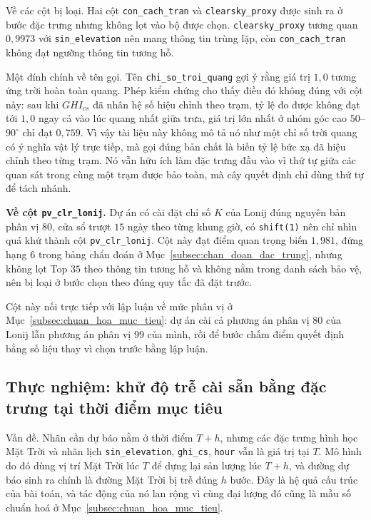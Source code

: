 \documentclass[12pt, a4paper]{report}
\begin{document}
Về các cột bị loại. Hai cột \texttt{con\_cach\_tran} và \texttt{clearsky\_proxy} được sinh ra ở bước đặc trưng nhưng
không lọt vào bộ được chọn. \texttt{clearsky\_proxy} tương quan $0{,}9973$ với
\texttt{sin\_elevation} nên mang thông tin trùng lặp, còn \texttt{con\_cach\_tran} không đạt ngưỡng
thông tin tương hỗ.

Một đính chính về tên gọi. Tên \texttt{chi\_so\_troi\_quang} gợi ý rằng giá trị $1{,}0$
tương ứng trời hoàn toàn quang. Phép kiểm chứng cho thấy điều đó không đúng với cột này: sau
khi $GHI_{cs}$ đã nhân hệ số hiệu chỉnh theo trạm, tỷ lệ đo được không đạt tới $1{,}0$
ngay cả vào lúc quang nhất giữa trưa, giá trị lớn nhất ở nhóm góc cao $50$--$90^\circ$ chỉ
đạt $0{,}759$. Vì vậy tài liệu này không mô tả nó như một chỉ số trời quang có ý nghĩa vật lý
trực tiếp, mà gọi đúng bản chất là biến tỷ lệ bức xạ đã hiệu chỉnh theo từng trạm. Nó
vẫn hữu ích làm đặc trưng đầu vào vì thứ tự giữa các quan sát trong cùng một trạm được bảo
toàn, mà cây quyết định chỉ dùng thứ tự để tách nhánh.

\textbf{Về cột \texttt{pv\_clr\_lonij}.} Dự án có cài đặt chỉ số $K$ của Lonij đúng nguyên bản
phân vị $80$, cửa sổ trượt $15$ ngày theo từng khung giờ, có \texttt{shift(1)} nên chỉ nhìn quá
khứ thành cột \texttt{pv\_clr\_lonij}. Cột này đạt điểm quan trọng biến $1{,}981$, đứng hạng $6$
trong bảng chẩn đoán ở Mục~\ref{subsec:chan_doan_dac_trung}, nhưng không lọt Top $35$ theo thông tin tương hỗ và không nằm
trong danh sách bảo vệ, nên bị loại ở bước chọn theo đúng quy tắc đã đặt trước.

Cột này nối trực tiếp với lập luận về mức phân vị ở Mục~\ref{subsec:chuan_hoa_muc_tieu}: dự án cài cả phương án phân vị
$80$ của Lonij lẫn phương án phân vị $99$ của mình, rồi để bước chấm điểm quyết định bằng số
liệu thay vì chọn trước bằng lập luận.

\FloatBarrier
\subsection{Thực nghiệm: khử độ trễ cài sẵn bằng đặc trưng tại thời điểm mục tiêu}
\label{subsec:khu_tre_mt}

Vấn đề. Nhãn cần dự báo nằm ở thời điểm $T{+}h$, nhưng các đặc trưng hình học Mặt Trời
và nhãn lịch \texttt{sin\_elevation}, \texttt{ghi\_cs}, \texttt{hour} vẫn là giá trị tại $T$. Mô
hình do đó dùng vị trí Mặt Trời lúc $T$ để dựng lại sản lượng lúc $T{+}h$, và đường dự báo sinh
ra chính là đường Mặt Trời bị trễ đúng $h$ bước. Đây là hệ quả cấu trúc của bài toán, và tác
động của nó lan rộng vì cùng đại lượng đó cũng là mẫu số chuẩn hoá ở Mục~\ref{subsec:chuan_hoa_muc_tieu}.
\end{document}
